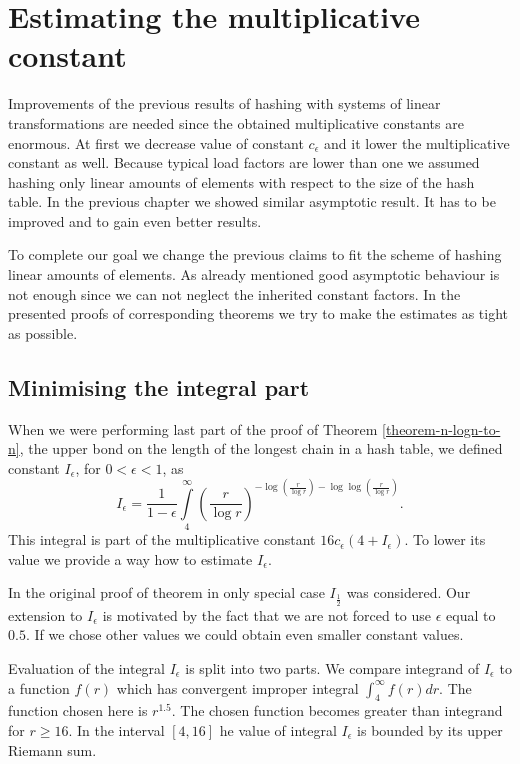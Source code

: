 \chapter{Estimating the multiplicative constant}
Improvements of the previous results of hashing with systems of linear transformations are needed since the obtained multiplicative constants are enormous. At first we decrease value of constant $c_\epsilon$ and it lower the multiplicative constant as well. Because typical load factors are lower than one we assumed hashing only linear amounts of elements with respect to the size of the hash table. In the previous chapter we showed similar asymptotic result. It has to be improved and to gain even better results.

To complete our goal we change the previous claims to fit the scheme of hashing linear amounts of elements. As already mentioned good asymptotic behaviour is not enough since we can not neglect the inherited constant factors. In the presented proofs of corresponding theorems we try to make the estimates as tight as possible.

\section{Minimising the integral part}
\label{section-integral-estimate}
When we were performing last part of the proof of Theorem \ref{theorem-n-logn-to-n}, the upper bond on the length of the longest chain in a hash table, we defined constant $I_\epsilon$, for $0 < \epsilon < 1$, as
\[
I_{\epsilon} = \frac{1}{1 - \epsilon} \displaystyle\int\limits_4^\infty \left(\frac{r}{\log r}\right)^{-\log \left(\frac{r}{\log r}\right) - \log \log \left(\frac{r}{\log r}\right)} \text{.}
\]
This integral is part of the multiplicative constant $16c_\epsilon(4 + I_\epsilon)$. To lower its value we provide a way how to estimate $I_\epsilon$.

In the original proof of theorem in \cite{DBLP:journals/jacm/AlonDMPT99} only special case $I_{\frac{1}{2}}$ was considered. Our extension to $I_\epsilon$ is motivated by the fact that we are not forced to use $\epsilon$ equal to $0.5$. If we chose other values we could obtain even smaller constant values.

Evaluation of the integral $I_\epsilon$ is split into two parts. We compare integrand of $I_\epsilon$ to a function $f(r)$ which has convergent improper integral $\int_{4}^{\infty} f(r) dr$. The function chosen here is $r^{1.5}$. The chosen function becomes greater than integrand for $r \geq 16$. In the interval $[4, 16]$ he value of integral $I_\epsilon$ is bounded by its upper Riemann sum.

